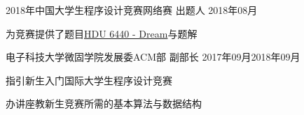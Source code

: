 
\begin{projitem}
    {2018年中国大学生程序设计竞赛网络赛}
    {出题人}
    {2018年08月}{}
    \item 为竞赛提供了题目\href{http://acm.hdu.edu.cn/showproblem.php?pid=6440}{HDU 6440 - Dream}与题解
\end{projitem}

\begin{projitem}
    {电子科技大学微固学院发展委ACM部}
    {副部长}
    {2017年09月}{2018年09月}
    \item 指引新生入门国际大学生程序设计竞赛
    \item 办讲座教新生竞赛所需的基本算法与数据结构
\end{projitem}

\endinput